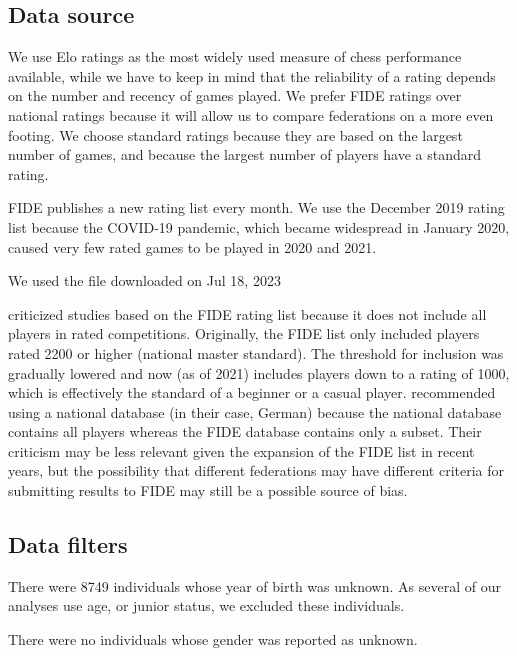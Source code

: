 \documentclass[9pt,twocolumn,twoside,lineno]{pnas-new}
\begin{document}
\subsection*{Data source}
We use Elo ratings as the most  widely used measure of chess performance available, while we have to keep in mind that the reliability of a rating depends on the number and recency of games played. 
We prefer FIDE ratings over national ratings because it will allow us to compare federations on a more even footing. We choose standard ratings because they are based on the largest number of games, and because the largest number of players have a standard rating. 


FIDE publishes a new rating list every month. We use the December 2019 rating list because the COVID-19 pandemic, which became widespread in January 2020, caused very few rated games to be played in 2020 and 2021. 

We used the file downloaded on Jul 18, 2023


\cite{vacigulabilalic} criticized studies based on the FIDE rating list because it does not include all players in rated competitions. Originally, the FIDE list only included players rated 2200 or higher (national master standard). The threshold for inclusion was gradually lowered and now (as of 2021)  includes players down to a rating of 1000, which is effectively the standard of a beginner or a  casual player. \cite{vacigulabilalic} recommended using a national database (in their case, German) because the national database contains all players whereas the FIDE database contains only a subset. Their criticism may be less relevant given the expansion of the FIDE list in recent years, but the possibility that different federations may have different criteria for submitting results to FIDE may still be a possible source of bias.


\subsection*{Data filters}

There were 8749 individuals whose year of birth was unknown. As several of our analyses use age, or junior status, we excluded these individuals. 

There were no individuals whose gender was reported as unknown.
\end{document}
